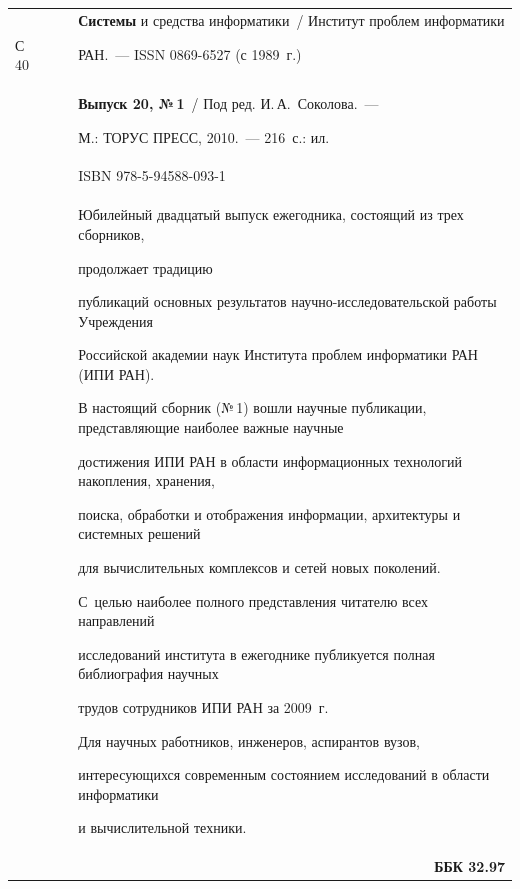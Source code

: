 \documentclass[11pt]{book}
\begin{document}
\vspace*{1mm}





{ %


\scriptsize




{\tabcolsep=0pt


\begin{tabular}{lp{294.7pt}}


&{{\hspace*{5ex}\textbf{Системы} и средства информатики~/ Институт проблем информатики}}\\


{С\,40}\ \  \ \ &{{РАН.~--- ISSN 0869-6527 (с 1989~г.)}}\\


&{{\hspace*{5ex}\textbf{Выпуск 20, №\,1}~/ Под ред. И.\,А.~Соколова.~--- 


М.: ТОРУС ПРЕСС, 2010.~--- 216~с.: ил.}}\\[1.2mm]


& ISBN 978-5-94588-093-1\\[1.2mm]


&\hspace*{6mm}Юбилейный двадцатый выпуск ежегодника, состоящий из трех сборников,


продолжает традицию 


публикаций основных результатов научно-ис\-сле\-до\-вательской работы Учреждения 


Российской академии наук Института проблем информатики РАН (ИПИ РАН). 


В настоящий сборник (№\,1) вошли научные публикации, представляющие наиболее важные научные 


достижения ИПИ РАН в области информационных технологий накопления, хранения, 


поиска, обработки и отображения информации, архитектуры и системных решений 


для вы\-чис\-ли\-тель\-ных комплексов и сетей новых поколений.


С~целью наиболее полного представления читателю всех направлений 


исследований института в ежегоднике публикуется полная библиография научных 


трудов сотрудников ИПИ РАН за 2009~г.\par


\hspace*{6mm}Для научных работников, инженеров, аспирантов вузов, 


интересу\-ющихся современным состоянием исследований в области информатики 


и вычислительной техники.


\\[0.5mm]


&\multicolumn{1}{r}{{\bf ББК 32.97}}\\


\end{tabular}}}
\end{document}
